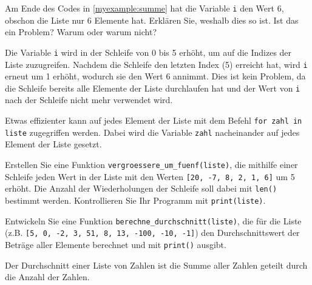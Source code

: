 \begin{myexercise}
	Am Ende des Codes in \cref{myexample:summe} hat die Variable \lstinline|i| den Wert 6, obschon die Liste nur 6 Elemente hat. Erklären Sie, weshalb dies so ist. Ist das ein Problem? Warum oder warum nicht?
	\begin{myanswer}
		Die Variable \lstinline|i| wird in der Schleife von 0 bis 5 erhöht, um auf die Indizes der Liste zuzugreifen. Nachdem die Schleife den letzten Index (5) erreicht hat, wird \lstinline|i| erneut um 1 erhöht, wodurch sie den Wert 6 annimmt. Dies ist kein Problem, da die Schleife bereits alle Elemente der Liste durchlaufen hat und der Wert von \lstinline|i| nach der Schleife nicht mehr verwendet wird.
	\end{myanswer}
\end{myexercise}

\begin{myexample}
	Etwas effizienter kann auf jedes Element der Liste mit dem Befehl \lstinline|for zahl in liste| zugegriffen werden. Dabei wird die Variable \lstinline|zahl| nacheinander auf jedes Element der Liste gesetzt.
	
\end{myexample}

\begin{myexercise}
	Erstellen Sie eine Funktion \lstinline|vergroessere_um_fuenf(liste)|, die mithilfe einer Schleife jeden Wert in der Liste mit den Werten \lstinline|[20, -7, 8, 2, 1, 6]| um 5 erhöht. Die Anzahl der Wiederholungen der Schleife soll dabei mit \lstinline|len()| bestimmt werden. Kontrollieren Sie Ihr Programm mit \lstinline|print(liste)|.

	\begin{myanswer}
		
	\end{myanswer}
\end{myexercise}



\begin{myexercise}
	Entwickeln Sie eine Funktion \lstinline|berechne_durchschnitt(liste)|, die für die Liste (z.B. \lstinline|[5, 0, -2, 3, 51, 8, 13, -100, -10, -1]|) den Durchschnittswert der Beträge aller Elemente berechnet und mit \lstinline|print()| ausgibt.

	Der Durchschnitt einer Liste von Zahlen ist die Summe aller Zahlen geteilt durch die Anzahl der Zahlen.
	\begin{myanswer}
		
	\end{myanswer}
\end{myexercise}

